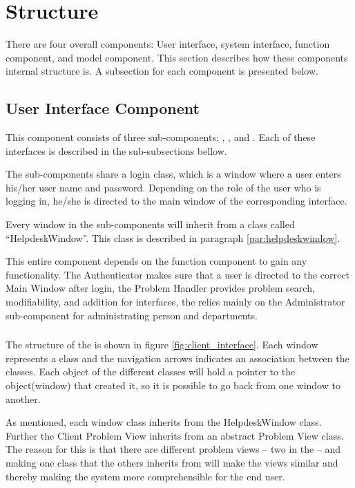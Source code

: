\section{Structure}
There are four overall components: User interface, system interface, function component, and model component.
This section describes how these components internal structure is.
A subsection for each component is presented below.

\subsection{User Interface Component}
This component consists of three sub-components: \cinterface[], \sinterface[], and \ainterface[].
Each of these interfaces is described in the sub-subsections bellow.

The sub-components share a login class, which is a window where a user enters his/her user name and password.
Depending on the role of the user who is logging in, he/she is directed to the main window of the corresponding interface.

Every window in the sub-components will inherit from a class called ``HelpdeskWindow''.
This class is described in paragraph \ref{par:helpdeskwindow}.

This entire component depends on the function component to gain any functionality. The Authenticator makes sure that a user is directed to the correct Main Window after login, the Problem Handler provides problem search, modifiability, and addition for interfaces, the \ainterface[] relies mainly on the Administrator sub-component for administrating person and departments.

\subsubsection{\cinterface[]}
The structure of the \cinterface[] is shown in figure \ref{fig:client_interface}.
Each window represents a class and the navigation arrows indicates an association between the classes.
Each object of the different classes will hold a pointer to the object(window) that created it, so it is possible to go back from one window to another.

As mentioned, each window class inherits from the HelpdeskWindow class.
Further the Client Problem View inherits from an abstract Problem View class. The reason for this is that there are different problem views -- two in the \sinterface[] -- and making one class that the others inherits from will make the views similar and thereby making the system more comprehensible for the end user.

